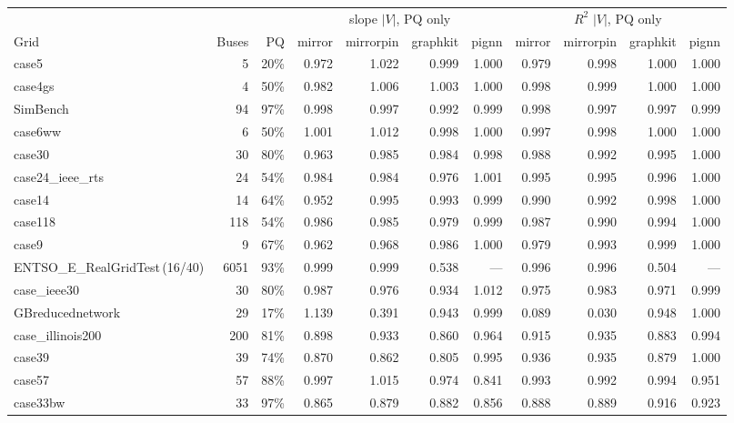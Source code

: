 \documentclass[10pt]{article}
\begin{document}
\begin{landscape}
\begin{table}[H]
\centering\scriptsize
\begin{tabular}{lrr rrrr rrrr}
\toprule
 & & & \multicolumn{4}{c}{slope $|V|$, PQ only} & \multicolumn{4}{c}{$R^2$ $|V|$, PQ only} \\
\cmidrule(lr){4-7}\cmidrule(lr){8-11}
Grid & Buses & PQ & mirror & mirrorpin & graphkit & pignn & mirror & mirrorpin & graphkit & pignn \\
\midrule
case5 & 5 & 20\% & 0.972 & 1.022 & 0.999 & 1.000 & 0.979 & 0.998 & 1.000 & 1.000 \\
case4gs & 4 & 50\% & 0.982 & 1.006 & 1.003 & 1.000 & 0.998 & 0.999 & 1.000 & 1.000 \\
SimBench & 94 & 97\% & 0.998 & 0.997 & 0.992 & 0.999 & 0.998 & 0.997 & 0.997 & 0.999 \\
case6ww & 6 & 50\% & 1.001 & 1.012 & 0.998 & 1.000 & 0.997 & 0.998 & 1.000 & 1.000 \\
case30 & 30 & 80\% & 0.963 & 0.985 & 0.984 & 0.998 & 0.988 & 0.992 & 0.995 & 1.000 \\
case24\_ieee\_rts & 24 & 54\% & 0.984 & 0.984 & 0.976 & 1.001 & 0.995 & 0.995 & 0.996 & 1.000 \\
case14 & 14 & 64\% & 0.952 & 0.995 & 0.993 & 0.999 & 0.990 & 0.992 & 0.998 & 1.000 \\
case118 & 118 & 54\% & 0.986 & 0.985 & 0.979 & 0.999 & 0.987 & 0.990 & 0.994 & 1.000 \\
case9 & 9 & 67\% & 0.962 & 0.968 & 0.986 & 1.000 & 0.979 & 0.993 & 0.999 & 1.000 \\
ENTSO\_E\_RealGridTest\,(16/40) & 6051 & 93\% & 0.999 & 0.999 & 0.538 & --- & 0.996 & 0.996 & 0.504 & --- \\
case\_ieee30 & 30 & 80\% & 0.987 & 0.976 & 0.934 & 1.012 & 0.975 & 0.983 & 0.971 & 0.999 \\
GBreducednetwork & 29 & 17\% & 1.139 & 0.391 & 0.943 & 0.999 & 0.089 & 0.030 & 0.948 & 1.000 \\
case\_illinois200 & 200 & 81\% & 0.898 & 0.933 & 0.860 & 0.964 & 0.915 & 0.935 & 0.883 & 0.994 \\
case39 & 39 & 74\% & 0.870 & 0.862 & 0.805 & 0.995 & 0.936 & 0.935 & 0.879 & 1.000 \\
case57 & 57 & 88\% & 0.997 & 1.015 & 0.974 & 0.841 & 0.993 & 0.992 & 0.994 & 0.951 \\
case33bw & 33 & 97\% & 0.865 & 0.879 & 0.882 & 0.856 & 0.888 & 0.889 & 0.916 & 0.923 \\

\end{tabular}
\end{table}
\end{landscape}
\end{document}
